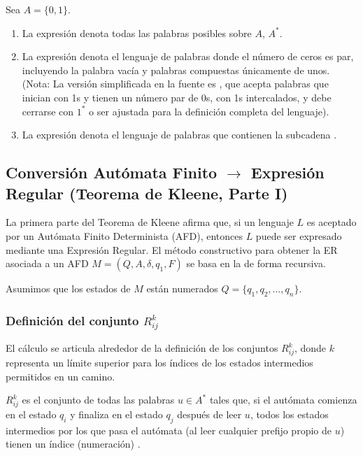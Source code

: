\begin{ejemplo}
Sea $A=\{0, 1\}$.
\begin{enumerate}
    \item La expresión  denota todas las palabras posibles sobre $A$, $A^*$.
    \item La expresión  denota el lenguaje de palabras donde el número de ceros es par, incluyendo la palabra vacía y palabras compuestas únicamente de unos. (Nota: La versión simplificada en la fuente es , que acepta palabras que inician con 1s y tienen un número par de 0s, con 1s intercalados, y debe cerrarse con $1^*$ o ser ajustada para la definición completa del lenguaje).
    \item La expresión  denota el lenguaje de palabras que contienen la subcadena .
\end{enumerate}
\end{ejemplo}

\subsection{Conversión Autómata Finito $\to$ Expresión Regular (Teorema de Kleene, Parte I)} %

La primera parte del Teorema de Kleene afirma que, si un lenguaje $L$ es aceptado por un Autómata Finito Determinista (AFD), entonces $L$ puede ser expresado mediante una Expresión Regular. El método constructivo para obtener la ER asociada a un AFD $M=(Q, A, \delta, q_1, F)$ se basa en la  de forma recursiva.

Asumimos que los estados de $M$ están numerados $Q = \{q_1, q_2, \ldots, q_n\}$.

\subsubsection{Definición del conjunto $R_{ij}^k$} %

El cálculo se articula alrededor de la definición de los conjuntos $R_{ij}^k$, donde $k$ representa un límite superior para los índices de los estados intermedios permitidos en un camino.

\begin{definicion}
$R_{ij}^k$ es el conjunto de todas las palabras $u \in A^*$ tales que, si el autómata comienza en el estado $q_i$ y finaliza en el estado $q_j$ después de leer $u$, todos los estados intermedios por los que pasa el autómata (al leer cualquier prefijo propio de $u$) tienen un índice (numeración) .
\end{definicion}

